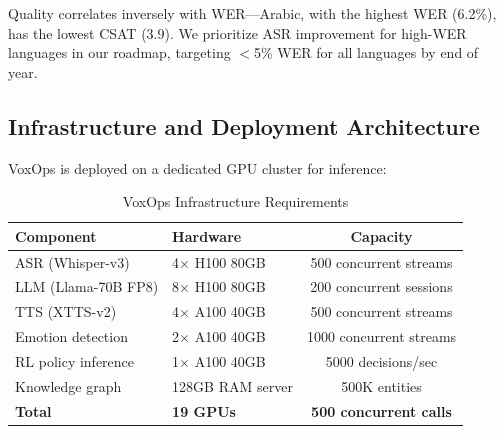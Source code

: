 \documentclass[conference,10pt]{IEEEtran}
\begin{document}
\begin{table}[!htbp]
\caption{Per-Language Quality Metrics (Top-10 Languages by Volume)}
\label{tab:perlang}
\centering\scriptsize
{}
\end{table}

Quality correlates inversely with WER---Arabic, with the highest WER (6.2\%), has the lowest CSAT (3.9). We prioritize ASR improvement for high-WER languages in our roadmap, targeting $<$5\% WER for all languages by end of year.

\subsection{Infrastructure and Deployment Architecture}

VoxOps is deployed on a dedicated GPU cluster for inference:

\begin{table}[!htbp]
\caption{VoxOps Infrastructure Requirements}
\label{tab:infra}
\centering\scriptsize
\begin{tabular}{@{}llc@{}}
\toprule
\textbf{Component} & \textbf{Hardware} & \textbf{Capacity} \\
\midrule
ASR (Whisper-v3) & 4$\times$ H100 80GB & 500 concurrent streams \\
LLM (Llama-70B FP8) & 8$\times$ H100 80GB & 200 concurrent sessions \\
TTS (XTTS-v2) & 4$\times$ A100 40GB & 500 concurrent streams \\
Emotion detection & 2$\times$ A100 40GB & 1000 concurrent streams \\
RL policy inference & 1$\times$ A100 40GB & 5000 decisions/sec \\
Knowledge graph & 128GB RAM server & 500K entities \\
\midrule
\textbf{Total} & \textbf{19 GPUs} & \textbf{500 concurrent calls} \\
\bottomrule
\end{tabular}
\end{table}
\end{document}
